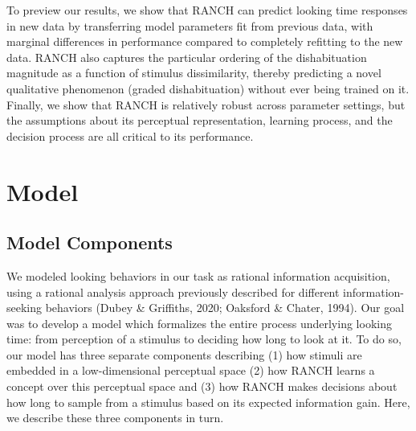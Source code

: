 \documentclass[10pt, letterpaper]{article}
\begin{document}
To preview our results, we show that RANCH can predict looking time
responses in new data by transferring model parameters fit from previous
data, with marginal differences in performance compared to completely
refitting to the new data. RANCH also captures the particular ordering
of the dishabituation magnitude as a function of stimulus dissimilarity,
thereby predicting a novel qualitative phenomenon (graded
dishabituation) without ever being trained on it. Finally, we show that
RANCH is relatively robust across parameter settings, but the
assumptions about its perceptual representation, learning process, and
the decision process are all critical to its performance.

\hypertarget{model}{%
\section{Model}\label{model}}

\hypertarget{model-components}{%
\subsection{Model Components}\label{model-components}}

We modeled looking behaviors in our task as rational information
acquisition, using a rational analysis approach previously described for
different information-seeking behaviors (Dubey \& Griffiths, 2020;
Oaksford \& Chater, 1994). Our goal was to develop a model which
formalizes the entire process underlying looking time: from perception
of a stimulus to deciding how long to look at it. To do so, our model
has three separate components describing (1) how stimuli are embedded in
a low-dimensional perceptual space (2) how RANCH learns a concept over
this perceptual space and (3) how RANCH makes decisions about how long
to sample from a stimulus based on its expected information gain. Here,
we describe these three components in turn.
\end{document}
